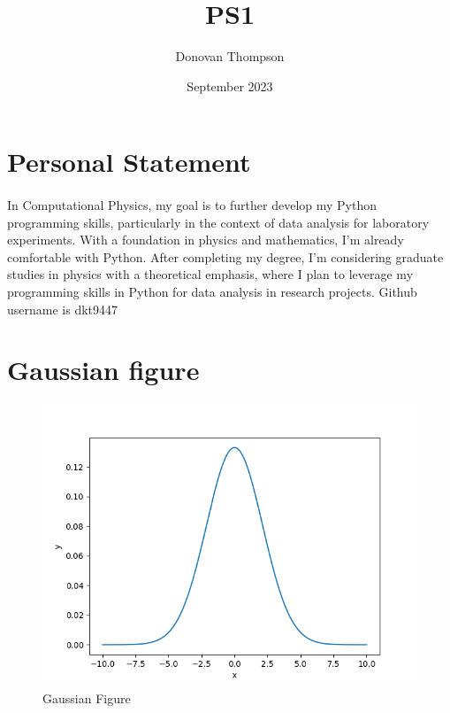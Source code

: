 \documentclass{article}
\title{PS1}
\author{Donovan Thompson }
\date{September 2023}
\begin{document}
\maketitle
\section{Personal Statement}
\paragraph{}
In Computational Physics, my goal is to further develop my Python programming skills, particularly in the context of data analysis for laboratory experiments. With a foundation in physics and mathematics, I'm already comfortable with Python. After completing my degree, I'm considering graduate studies in physics with a theoretical emphasis, where I plan to leverage my programming skills in Python for data analysis in research 
projects. Github username is dkt9447
\section{Gaussian figure}
\begin{figure}
    \centering
    \includegraphics[width=\textwidth,height=\textheight,keepaspectratio]{gaussian.png}
    \caption{Gaussian Figure}
    \label{fig:enter-label}
\end{figure}
\end{document}
